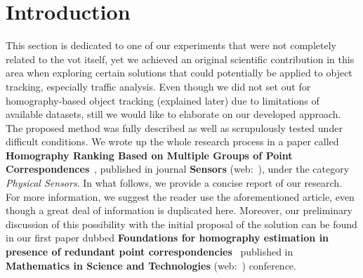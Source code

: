 \section{Introduction}
\label{sec:HomographyIntroduction}

This section is dedicated to one of our experiments that were not completely related to the \gls{vot} itself, yet we achieved an original scientific contribution in this area when exploring certain solutions that could potentially be applied to object tracking, especially traffic analysis. Even though we did not set out for homography-based object tracking (explained later) due to limitations of available datasets, still we would like to elaborate on our developed approach. The proposed method was fully described as well as scrupulously tested under difficult conditions. We wrote up the whole research process in a paper called \textbf{Homography Ranking Based on Multiple Groups of Point Correspondences}~\cite{ondrasovic2021homography}, published in journal \textbf{Sensors} (web:~\cite{websensors}), under the category \emph{Physical Sensors}. In what follows, we provide a concise report of our research. For more information, we suggest the reader use the aforementioned article, even though a great deal of information is duplicated here. Moreover, our preliminary discussion of this possibility with the initial proposal of the solution can be found in our first paper dubbed \textbf{Foundations for homography estimation in presence of redundant point correspondencies}~\cite{ondrasovic2020foundations} published in \textbf{Mathematics in Science and Technologies} (web:~\cite{webmistconf}) conference.
